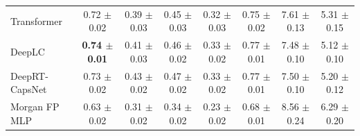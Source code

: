 \begin{table}[htbp]
\begin{tabular}{lccccccc}
    Transformer & 0.72 $\pm$ 0.02 & 0.39 $\pm$ 0.03 & 0.45 $\pm$ 0.03 & 0.32 $\pm$ 0.03 & 0.75 $\pm$ 0.02 & 7.61 $\pm$ 0.13 & 5.31 $\pm$ 0.15 \\
    DeepLC & \textbf{0.74 $\pm$ 0.01} & 0.41 $\pm$ 0.03 & 0.46 $\pm$ 0.02 & 0.33 $\pm$ 0.02 & 0.77 $\pm$ 0.01 & 7.48 $\pm$ 0.10 & 5.12 $\pm$ 0.10 \\
    DeepRT-CapsNet & 0.73 $\pm$ 0.02 & 0.43 $\pm$ 0.02 & 0.47 $\pm$ 0.02 & 0.33 $\pm$ 0.02 & 0.77 $\pm$ 0.01 & 7.50 $\pm$ 0.10 & 5.20 $\pm$ 0.12 \\
    Morgan FP MLP & 0.63 $\pm$ 0.02 & 0.31 $\pm$ 0.02 & 0.34 $\pm$ 0.02 & 0.23 $\pm$ 0.02 & 0.68 $\pm$ 0.01 & 8.56 $\pm$ 0.24 & 6.29 $\pm$ 0.20 \\
    \bottomrule
  \end{tabular}
\end{table}
